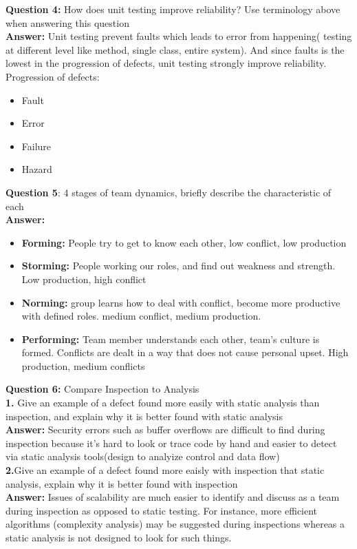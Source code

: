 \documentclass{article}
\begin{document}
\textbf{Question 4:} How does unit testing improve reliability? Use terminology
above when answering this question\\
\textbf{Answer:} Unit testing prevent faults which leads to error from
happening( testing at different level like method, single class, entire system).
And since faults is the lowest in the progression of defects, unit testing
strongly improve reliability. Progression of defects:\\
\begin{itemize}
  \item Fault
  \item Error
  \item Failure
  \item Hazard
  
  \end{itemize}
  
  \textbf{Question 5}: 4 stages of team dynamics, briefly describe the
  characteristic of each\\
  \textbf{Answer:} 
  \begin{itemize}
    \item \textbf{Forming:} People try to get to know each other, low conflict,
    low production
    \item \textbf{Storming:} People working our roles, and find out weakness and
    strength. Low production, high conflict
    \item  \textbf{Norming:} group learns how to deal with conflict, become more
    productive with defined roles. medium conflict, medium production.
    \item  \textbf{Performing:} Team member understands each other, team's
    culture is formed. Conflicts are dealt in a way that does not cause personal
    upset. High production, medium conflicts
  \end{itemize}

\textbf{Question 6:} Compare Inspection to Analysis\\
\textbf{1.} Give an example of a defect found more easily with static analysis
than inspection, and explain why it is better found with static analysis\\
\textbf{Answer:} Security errors such as buffer overflows are difficult to find
during inspection because it's hard to look or trace code by hand and easier to
detect via static analysis tools(design to analyize control and data flow)\\
\textbf{2.}Give an example of a defect found more eaisly with inspection that
static analysis, explain why it is better found with inspection\\
\textbf{Answer:} Issues of scalability are much easier to identify and discuss
as a team during inspection as opposed to static testing. For instance, more
efficient algorithms (complexity analysis) may be suggested during inspections
 whereas a static analysis is not designed to look for such things.\\
 
\end{document}
